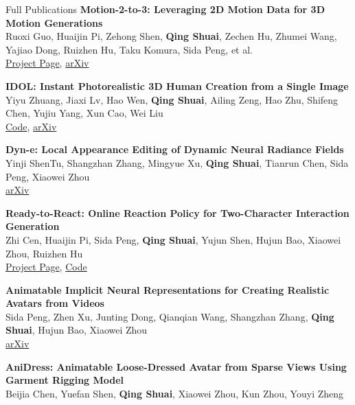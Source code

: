 \begin{rSection}{Full Publications}
    {\bf Motion-2-to-3: Leveraging 2D Motion Data for 3D Motion Generations}\hfill{ } \\
    Ruoxi Guo, Huaijin Pi, Zehong Shen, \textbf{Qing Shuai}, Zechen Hu, Zhumei Wang, Yajiao Dong, Ruizhen Hu, Taku Komura, Sida Peng, et al.\\
    \href{https://zju3dv.github.io/Motion-2-to-3/}{Project Page}, \href{https://arxiv.org/abs/2412.13111}{arXiv}

    {\bf IDOL: Instant Photorealistic 3D Human Creation from a Single Image}\hfill{ } \\
    Yiyu Zhuang, Jiaxi Lv, Hao Wen, \textbf{Qing Shuai}, Ailing Zeng, Hao Zhu, Shifeng Chen, Yujiu Yang, Xun Cao, Wei Liu\\
    \href{https://github.com/yiyuzhuang/IDOL}{Code}, \href{https://arxiv.org/abs/2412.14963}{arXiv}

    {\bf Dyn-e: Local Appearance Editing of Dynamic Neural Radiance Fields}\hfill{ } \\
    Yinji ShenTu, Shangzhan Zhang, Mingyue Xu, \textbf{Qing Shuai}, Tianrun Chen, Sida Peng, Xiaowei Zhou\\
    \href{https://arxiv.org/abs/2307.12909}{arXiv}

    {\bf Ready-to-React: Online Reaction Policy for Two-Character Interaction Generation}\hfill{ } \\
    Zhi Cen, Huaijin Pi, Sida Peng, \textbf{Qing Shuai}, Yujun Shen, Hujun Bao, Xiaowei Zhou, Ruizhen Hu\\
    \href{https://zju3dv.github.io/ready_to_react/}{Project Page}, \href{https://github.com/zju3dv/ready_to_react}{Code}

    {\bf Animatable Implicit Neural Representations for Creating Realistic Avatars from Videos}\hfill{ } \\
    Sida Peng, Zhen Xu, Junting Dong, Qianqian Wang, Shangzhan Zhang, \textbf{Qing Shuai}, Hujun Bao, Xiaowei Zhou\\
    \href{https://arxiv.org/abs/2203.08133}{arXiv}

    {\bf AniDress: Animatable Loose-Dressed Avatar from Sparse Views Using Garment Rigging Model}\hfill{ } \\
    Beijia Chen, Yuefan Shen, \textbf{Qing Shuai}, Xiaowei Zhou, Kun Zhou, Youyi Zheng


\end{rSection}
